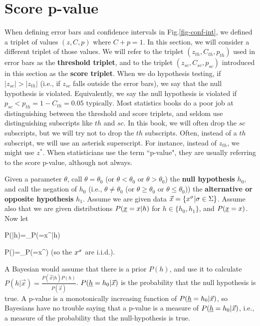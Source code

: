 \section{Score p-value}
\label{sec-score-p-value}
When defining error bars
and confidence intervals in 
Fig.\ref{fig-conf-int},
we defined a triplet 
of values $(z, C, p)$
where $C+p=1$.
In this section,
we will consider a different triplet
of those values.
We will refer to the triplet
$(z_{th}, C_{th}, p_{th})$
used in error bars as the {\bf threshold triplet}, and to
the triplet 
$(z_{sc}, C_{sc}, p_{sc})$
introduced in this section as the
{\bf score triplet}.
When we do hypothesis testing,
if $|z_{sc}|> |z_{th}|$
(i.e., if $z_{sc}$
falls outside
the error bars),
we say that the null
hypothesis is violated.
Equivalently, we say the null
hypothesis is violated
if $p_{sc}<p_{th}=1-C_{th}=0.05 \text{ typically}$. 
Most statistics 
books do a poor job 
at distinguishing between
the threshold and score
triplets, and 
seldom use distinguishing
subscripts like $th$ and $sc$.
In this book,
we will often
drop the $sc$
subscripts, but we will
try not to drop the $th$ subscripts.
Often, instead of
a $th$
subscript, we will
use an asterisk superscript.
For instance, instead
of $z_{th}$,
we might use $z^*$.
W\label{key}hen statisticians 
use the term
``p-value",
they are usually referring to
the score p-value,
although not always.



Given a parameter $\theta$, call
$\theta=\theta_0$ (or  $\theta<\theta_0$ or $\theta>\theta_0$) the
{\bf null hypothesis} $h_0$,
and call the negation of $h_0$ (i.e., 
$\theta\neq\theta_0$ (or  $\theta\geq\theta_0$ or $\theta\leq \theta_0$))
the {\bf alternative or
opposite hypothesis} $h_1$.
Assume we
are given data $\vec{x}=\{x^\sigma|\sigma\in \Sigma\}$. Assume
also that we are given
distributions $P({\underline{x}}=x|h)$ for $h\in \{h_0, h_1\}$,
and $P({\underline{x}}=x)$. Now let

\beq
P(|h)=\prod_\s P(\rvx=x^\s|h)
\eeq


\beq
P()=\prod_\s P(\rvx=x^\s)
\eeq
(so the $x^\sigma$ are i.i.d.).

A Bayesian would assume that there
is a prior $P(h)$, and use it to
calculate
$P(h|\vec{x})=\frac{P(\vec{x}|h) P(h)}{P(\vec{x})}$.
$P({\underline{h}}= h_0|\vec{x})$
is the probability that the null hypothesis is true.
A p-value is a monotonically increasing function of
$P({\underline{h}}= h_0|\vec{x})$,
so Bayesians have no trouble saying
that  {\color{red} a  p-value is
a measure of
$P({\underline{h}}= h_0|\vec{x})$, i.e.,
a measure of the probability that
the null-hypothesis is true}.

